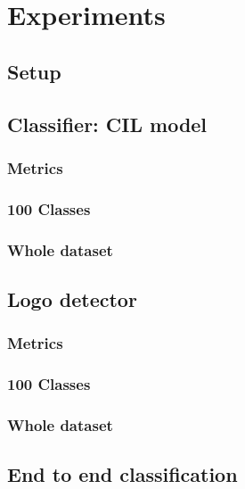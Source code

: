 \chapter{Experiments}
\label{chap:experiments}
\section{Setup}
\section{Classifier: CIL model}
\subsection{Metrics}
\subsection{100 Classes}
\subsection{Whole dataset}
\label{sec:whole_dataset_clf}
\section{Logo detector}
\subsection{Metrics}

\subsection{100 Classes}
\subsection{Whole dataset}
\section{End to end classification}

